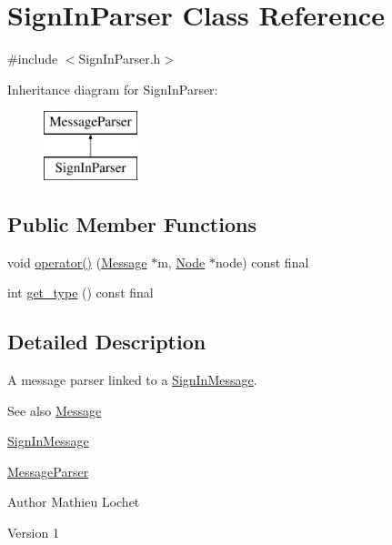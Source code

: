 \hypertarget{classSignInParser}{}\section{Sign\+In\+Parser Class Reference}
\label{classSignInParser}


{\ttfamily \#include $<$Sign\+In\+Parser.\+h$>$}

Inheritance diagram for Sign\+In\+Parser\+:\begin{figure}[H]
\begin{center}
\leavevmode
\includegraphics[height=2.000000cm]{classSignInParser}
\end{center}
\end{figure}
\subsection*{Public Member Functions}
\begin{DoxyCompactItemize}
\item 
void \mbox{\hyperlink{classSignInParser_aa73b5113c2c03361469149c456ef9cc0}{operator()}} (\mbox{\hyperlink{classMessage}{Message}} $\ast$m, \mbox{\hyperlink{classNode}{Node}} $\ast$node) const final
\item 
int \mbox{\hyperlink{classSignInParser_a30af4fa4b99e704e48848aab284d6a24}{get\+\_\+type}} () const final
\end{DoxyCompactItemize}


\subsection{Detailed Description}
A message parser linked to a \mbox{\hyperlink{classSignInMessage}{Sign\+In\+Message}}. \begin{DoxySeeAlso}{See also}
\mbox{\hyperlink{classMessage}{Message}} 

\mbox{\hyperlink{classSignInMessage}{Sign\+In\+Message}} 

\mbox{\hyperlink{classMessageParser}{Message\+Parser}}
\end{DoxySeeAlso}
\begin{DoxyAuthor}{Author}
Mathieu Lochet 
\end{DoxyAuthor}
\begin{DoxyVersion}{Version}
1 
\end{DoxyVersion}


